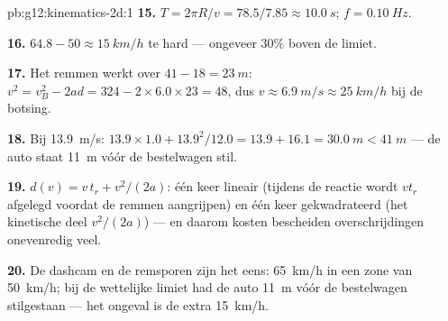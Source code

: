 \begin{solution}{pb:g12:kinematics-2d:1}
\textbf{15.} $T = 2\pi R/v = 78.5/7.85 \approx \qty{10.0}{s}$;
$f = \qty{0.10}{Hz}$.

\textbf{16.} $64.8 - 50 \approx \qty{15}{km/h}$ te hard --- ongeveer
$30\%$ boven de limiet.

\textbf{17.} Het remmen werkt over $41 - 18 = \qty{23}{m}$:
$v^2 = v_B^2 - 2ad = 324 - 2 \times 6.0 \times 23 = 48$, dus
$v \approx \qty{6.9}{m/s} \approx \qty{25}{km/h}$ bij de botsing.

\textbf{18.} Bij \qty{13.9}{m/s}: $13.9 \times 1.0 + 13.9^2/12.0 =
13.9 + 16.1 = \qty{30.0}{m} < \qty{41}{m}$ --- de auto staat
\qty{11}{m} vóór de bestelwagen stil.

\textbf{19.} $d(v) = v\,t_r + v^2/(2a)$: één keer lineair (tijdens de
reactie wordt $v t_r$ afgelegd voordat de remmen aangrijpen) en één keer
gekwadrateerd (het kinetische deel $v^2/(2a)$) --- en daarom kosten
bescheiden overschrijdingen onevenredig veel.

\textbf{20.} De dashcam en de remsporen zijn het eens: \qty{65}{km/h} in
een zone van \qty{50}{km/h}; bij de wettelijke limiet had de auto
\qty{11}{m} vóór de bestelwagen stilgestaan --- het ongeval is de extra
\qty{15}{km/h}.
\end{solution}
